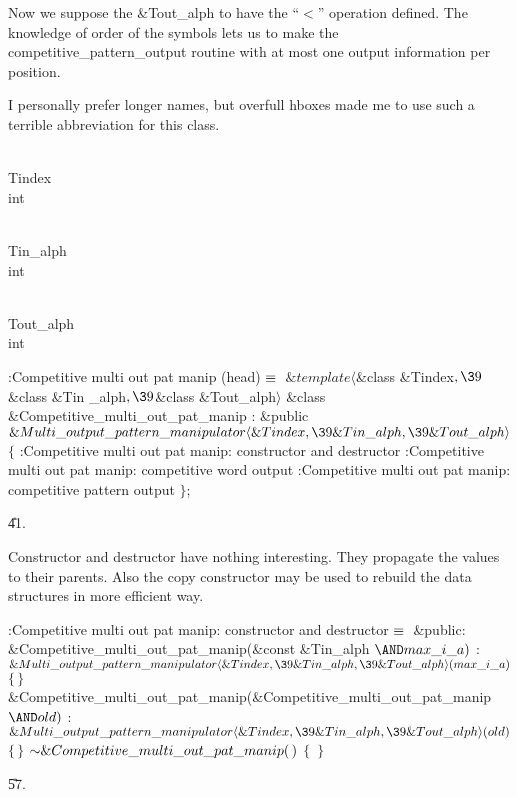 Now we suppose the \&{Tout\_alph} to have the ``$<$'' operation defined.
The knowledge of order of the symbols lets us to make the
\\{competitive\_pattern\_output} routine with at most one output information
per position.

I personally prefer longer names, but overfull hboxes made me to use
such a terrible abbreviation for this class.

\Y\B\F\\{Tindex} \5
\\{int}\par
\B\F\\{Tin\_alph} \5
\\{int}\par
\B\F\\{Tout\_alph} \5
\\{int}\par
\Y\B\4:Competitive multi out pat manip (head)\X${}\equiv{}$\6
$\&{template}\langle{}$\&{class} \&{Tindex}${},\39{}$\&{class} \&{Tin%
\_alph}${},\39{}$\&{class} \&{Tout\_alph}${}\rangle{}$\6
\&{class} \&{Competitive\_multi\_out\_pat\_manip} :\6
\&{public} ${}\&{Multi\_output\_pattern\_manipulator}\langle\&{Tindex},\39%
\&{Tin\_alph},\39\&{Tout\_alph}\rangle{}$ ${}\{{}$\1\6
:Competitive multi out pat manip: constructor and destructor\X\6
:Competitive multi out pat manip: competitive word output\X\6
:Competitive multi out pat manip: competitive pattern output\X\2\6
${}\}{}$;\par
\U41.\fi

Constructor and destructor have nothing interesting. They propagate
the values to their parents. Also the copy constructor may be used to
rebuild the data structures in more efficient way.

\Y\B\4:Competitive multi out pat manip: constructor and destructor\X${}%
\E{}$\6
\4\&{public}:\6
\&{Competitive\_multi\_out\_pat\_manip}(\&{const} \&{Tin\_alph} ${}{\AND}\\{max%
\_i\_a}){}$\1\1\2\2\6
: ${}\&{Multi\_output\_pattern\_manipulator}\langle\&{Tindex},\39\&{Tin\_alph},%
\39\&{Tout\_alph}\rangle(\\{max\_i\_a}){}$ ${}\{\,\}{}$\7
\&{Competitive\_multi\_out\_pat\_manip}(\&{Competitive\_multi\_out\_pat\_manip}
${}{\AND}\\{old}){}$\1\1\2\2\6
: ${}\&{Multi\_output\_pattern\_manipulator}\langle\&{Tindex},\39\&{Tin\_alph},%
\39\&{Tout\_alph}\rangle(\\{old}){}$ ${}\{\,\}{}$\7
${}{\sim}\&{Competitive\_multi\_out\_pat\_manip}(\,){}$\1\1\2\2\6
${}\{{}$\6
\,${}\}{}$\par
\U57.\fi

